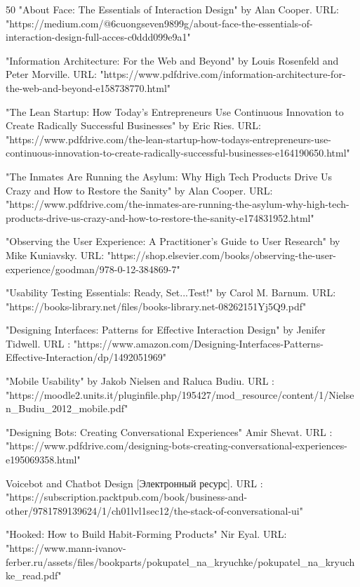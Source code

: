 \documentclass{article}
\begin{document}
\begin{thebibliography} {50}
"About Face: The Essentials of Interaction Design" by Alan Cooper. URL: "https://medium.com/@6cuongseven9899g/about-face-the-essentials-of-interaction-design-full-acces-c0ddd099e9a1"

"Information Architecture: For the Web and Beyond" by Louis Rosenfeld and Peter Morville. URL: "https://www.pdfdrive.com/information-architecture-for-the-web-and-beyond-e158738770.html"

"The Lean Startup: How Today's Entrepreneurs Use Continuous Innovation to Create Radically Successful Businesses" by Eric Ries. URL: "https://www.pdfdrive.com/the-lean-startup-how-todays-entrepreneurs-use-continuous-innovation-to-create-radically-successful-businesses-e164190650.html"

"The Inmates Are Running the Asylum: Why High Tech Products Drive Us Crazy and How to Restore the Sanity" by Alan Cooper. URL: "https://www.pdfdrive.com/the-inmates-are-running-the-asylum-why-high-tech-products-drive-us-crazy-and-how-to-restore-the-sanity-e174831952.html"

"Observing the User Experience: A Practitioner's Guide to User Research" by Mike Kuniavsky. URL: "https://shop.elsevier.com/books/observing-the-user-experience/goodman/978-0-12-384869-7"

"Usability Testing Essentials: Ready, Set...Test!" by Carol M. Barnum. URL: "https://books-library.net/files/books-library.net-08262151Yj5Q9.pdf"

"Designing Interfaces: Patterns for Effective Interaction Design" by Jenifer Tidwell. URL : "https://www.amazon.com/Designing-Interfaces-Patterns-Effective-Interaction/dp/1492051969"

"Mobile Usability" by Jakob Nielsen and Raluca Budiu. URL : "https://moodle2.units.it/pluginfile.php/195427/mod_resource/content/1/Nielsen_Budiu_2012_mobile.pdf"

"Designing Bots: Creating Conversational Experiences" Amir Shevat. URL : "https://www.pdfdrive.com/designing-bots-creating-conversational-experiences-e195069358.html"

Voicebot and Chatbot Design [Электронный ресурс]. URL : "https://subscription.packtpub.com/book/business-and-other/9781789139624/1/ch01lvl1sec12/the-stack-of-conversational-ui"

"Hooked: How to Build Habit-Forming Products" Nir Eyal. URL: "https://www.mann-ivanov-ferber.ru/assets/files/bookparts/pokupatel_na_kryuchke/pokupatel_na_kryuchke_read.pdf"


\end{thebibliography}
\end{document}
